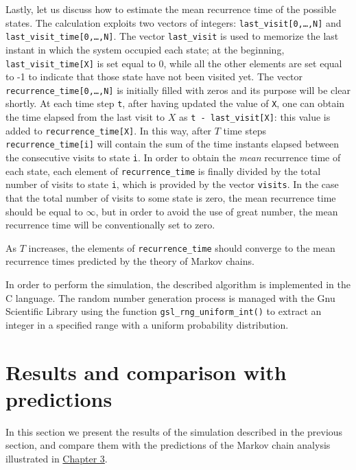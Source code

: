\smallskip
Lastly, let us discuss how to estimate the mean recurrence time of the possible states. The calculation exploits two vectors of integers: \texttt{last\_visit[0,\dots,N]} and \texttt{last\_visit\_time[0,\dots,N]}. The vector \texttt{last\_visit} is used to memorize the last instant in which the system occupied each state; at the beginning, \texttt{last\_visit\_time[X]} is set equal to 0, while all the other elements are set equal to -1 to indicate that those state have not been visited yet. The vector \texttt{recurrence\_time[0,\dots,N]} is initially filled with zeros and its purpose will be clear shortly. At each time step \texttt{t}, after having updated the value of \texttt{X}, one can obtain the time elapsed from the last visit to $X$ as \texttt{t - last\_visit[X]}: this value is added to \texttt{recurrence\_time[X]}. In this way, after $T$ time steps \texttt{recurrence\_time[i]} will contain the sum of the time instants elapsed between the consecutive visits to state \texttt{i}. In order to obtain the \emph{mean} recurrence time of each state, each element of \texttt{recurrence\_time} is finally divided by the total number of visits to state \texttt{i}, which is provided by the vector \texttt{visits}. In the case that the total number of visits to some state is zero, the mean recurrence time should be equal to $\infty$, but in order to avoid the use of great number, the mean recurrence time will be conventionally set to zero. 

As $T$ increases, the elements of \texttt{recurrence\_time} should converge to the mean recurrence times predicted by the theory of Markov chains.

\medskip
In order to perform the simulation, the described algorithm is implemented in the C language. The random number generation process is managed with the Gnu Scientific Library using the function \texttt{gsl\_rng\_uniform\_int()} to extract an integer in a specified range with a uniform probability distribution.

\section{Results and comparison with predictions}
In this section we present the results of the simulation described in the previous section, and compare them with the predictions of the Markov chain analysis illustrated in \hyperref[ch:3]{Chapter 3}.

